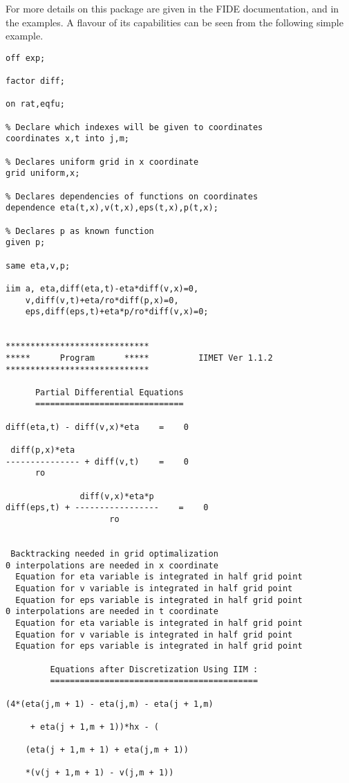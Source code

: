 \documentclass[11pt,letterpaper]{book}
\begin{document}
For more details on this package are given in the FIDE documentation,
and in the examples.  A flavour of its capabilities can be seen from
the following simple example.

{\small\begin{verbatim}
off exp;

factor diff;

on rat,eqfu;

% Declare which indexes will be given to coordinates
coordinates x,t into j,m;

% Declares uniform grid in x coordinate
grid uniform,x;

% Declares dependencies of functions on coordinates
dependence eta(t,x),v(t,x),eps(t,x),p(t,x);

% Declares p as known function
given p;

same eta,v,p;

iim a, eta,diff(eta,t)-eta*diff(v,x)=0,
    v,diff(v,t)+eta/ro*diff(p,x)=0,
    eps,diff(eps,t)+eta*p/ro*diff(v,x)=0;


*****************************
*****      Program      *****          IIMET Ver 1.1.2
*****************************

      Partial Differential Equations
      ==============================

diff(eta,t) - diff(v,x)*eta    =    0

 diff(p,x)*eta
--------------- + diff(v,t)    =    0
      ro

               diff(v,x)*eta*p
diff(eps,t) + -----------------    =    0
                     ro


 Backtracking needed in grid optimalization
0 interpolations are needed in x coordinate
  Equation for eta variable is integrated in half grid point
  Equation for v variable is integrated in half grid point
  Equation for eps variable is integrated in half grid point
0 interpolations are needed in t coordinate
  Equation for eta variable is integrated in half grid point
  Equation for v variable is integrated in half grid point
  Equation for eps variable is integrated in half grid point

         Equations after Discretization Using IIM :
         ==========================================

(4*(eta(j,m + 1) - eta(j,m) - eta(j + 1,m)

     + eta(j + 1,m + 1))*hx - (

    (eta(j + 1,m + 1) + eta(j,m + 1))

    *(v(j + 1,m + 1) - v(j,m + 1))


\end{verbatim}}
\end{document}
